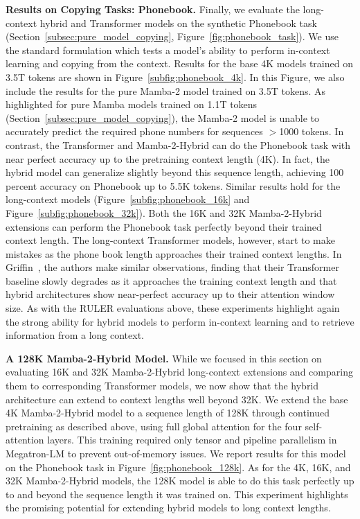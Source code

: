 \textbf{Results on Copying Tasks: Phonebook.} Finally, we evaluate the long-context hybrid and Transformer models on the synthetic Phonebook task (Section~\ref{subsec:pure_model_copying}, Figure~\ref{fig:phonebook_task}). We use the standard formulation which tests a model's ability to perform in-context learning and copying from the context. Results for the base 4K models trained on 3.5T tokens are shown in Figure~\ref{subfig:phonebook_4k}. In this Figure, we also include the results for the pure Mamba-2 model trained on 3.5T tokens. As highlighted for pure Mamba models trained on 1.1T tokens (Section~\ref{subsec:pure_model_copying}), the Mamba-2 model is unable to accurately predict the required phone numbers for sequences $>$1000 tokens. In contrast, the Transformer and Mamba-2-Hybrid can do the Phonebook task with near perfect accuracy up to the pretraining context length (4K). In fact, the hybrid model can generalize slightly beyond this sequence length, achieving 100 percent accuracy on Phonebook up to 5.5K tokens. Similar results hold for the long-context models (Figure~\ref{subfig:phonebook_16k} and Figure~\ref{subfig:phonebook_32k}). Both the 16K and 32K Mamba-2-Hybrid extensions can perform the Phonebook task perfectly beyond their trained context length. The long-context Transformer models, however, start to make mistakes as the phone book length approaches their trained context lengths. In Griffin~\citep{de2024griffin}, the authors make similar observations, finding that their Transformer baseline slowly degrades as it approaches the training context length and that hybrid architectures show near-perfect accuracy up to their attention window size. As with the RULER evaluations above, these experiments highlight again the strong ability for hybrid models to perform in-context learning and to retrieve information from a long context.

\textbf{A 128K Mamba-2-Hybrid Model.} While we focused in this section on evaluating 16K and 32K Mamba-2-Hybrid long-context extensions and comparing them to corresponding Transformer models, we now show that the hybrid architecture can extend to context lengths well beyond 32K. We extend the base 4K Mamba-2-Hybrid model to a sequence length of 128K through continued pretraining as described above, using full global attention for the four self-attention layers. This training required only tensor and pipeline parallelism in Megatron-LM to prevent out-of-memory issues. We report results for this model on the Phonebook task in Figure~\ref{fig:phonebook_128k}. As for the 4K, 16K, and 32K Mamba-2-Hybrid models, the 128K model is able to do this task perfectly up to and beyond the sequence length it was trained on. This experiment highlights the promising potential for extending hybrid models to long context lengths.

